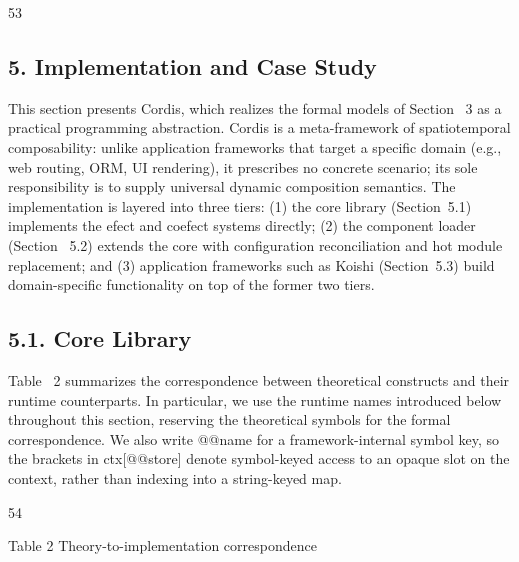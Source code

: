 \documentclass[
  10
]{article}
\begin{document}
53

\subsection{5. Implementation and Case
Study}\label{implementation-and-case-study}

This section presents Cordis, which realizes the formal models of
Section~ 3 as a practical programming abstraction. Cordis is a
meta-framework of spatiotemporal composability: unlike application
frameworks that target a specific domain (e.g., web routing, ORM, UI
rendering), it prescribes no concrete scenario; its sole responsibility
is to supply universal dynamic composition semantics. The implementation
is layered into three tiers: (1) the core library (Section~5.1)
implements the efect and coefect systems directly; (2) the component
loader (Section~ 5.2) extends the core with configuration reconciliation
and hot module replacement; and (3) application frameworks such as
Koishi (Section~5.3) build domain-specific functionality on top of the
former two tiers.

\subsection{5.1. Core Library}\label{core-library}

Table~ 2 summarizes the correspondence between theoretical constructs
and their runtime counterparts. In particular, we use the runtime names
introduced below throughout this section, reserving the theoretical
symbols for the formal correspondence. We also write @@name for a
framework-internal symbol key, so the brackets in ctx{[}@@store{]}
denote symbol-keyed access to an opaque slot on the context, rather than
indexing into a string-keyed map.

54

Table 2 \textbar{} Theory-to-implementation correspondence
\end{document}

